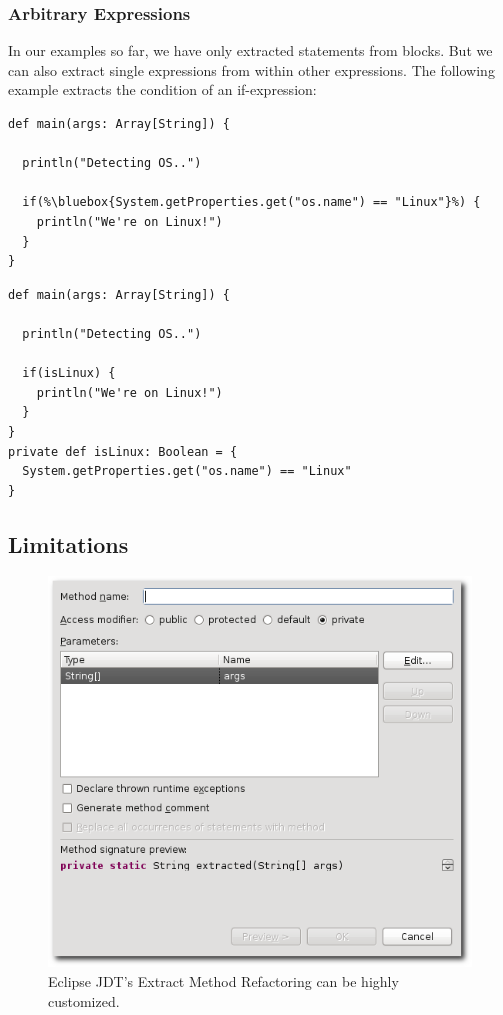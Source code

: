 \documentclass[10pt,a4paper,oneside]{scrreprt}
\begin{document}
\subsubsection{Arbitrary Expressions}

In our examples so far, we have only extracted statements from blocks. But we can also extract single expressions from within other expressions. The following example extracts the condition of an if-expression:

\begin{lstlisting}
def main(args: Array[String]) {

  println("Detecting OS..")
  
  if(%\bluebox{System.getProperties.get("os.name") == "Linux"}%) {
    println("We're on Linux!")
  }
}
\end{lstlisting}
\begin{lstlisting}
def main(args: Array[String]) {

  println("Detecting OS..")
  
  if(isLinux) {
    println("We're on Linux!")
  }
}
private def isLinux: Boolean = {
  System.getProperties.get("os.name") == "Linux"
}
\end{lstlisting}

\subsection{Limitations}

\begin{figure}
  \centering
  \includegraphics[width=0.6\linewidth]{extract_method_java_screenshot_1.png}
  \caption{Eclipse JDT's Extract Method Refactoring can be highly customized.}
  \label{figure:extract-method-java-screenshot-1}
\end{figure}
\end{document}
